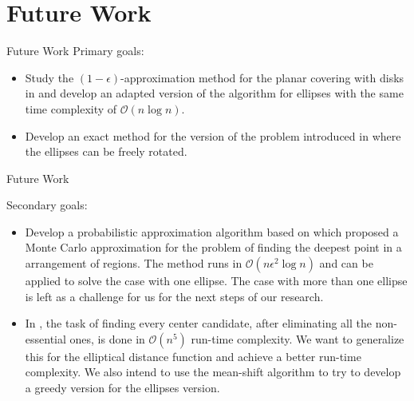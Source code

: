 \documentclass{beamer}
\newcommand{\bigO}{\mathscr{O}}
\begin{document}
\section{Future Work}

\begin{frame}{Future Work}
	Primary goals:
\begin{itemize}
	\item Study the $(1-\epsilon)$-approximation method for the planar covering with disks in \autocite{cabello:2006} and develop an adapted version of the algorithm for ellipses with the same time complexity of $\bigO(n\log{n})$.
	
	\item Develop an exact method for the version of the problem introduced in \autocite{andreta} where the ellipses can be freely rotated.
\end{itemize}
\end{frame}

\begin{frame}{Future Work}
	
	Secondary goals:
	\begin{itemize}
		 

	\item Develop a probabilistic approximation algorithm based on \autocite{aronov:2008} which proposed a Monte Carlo approximation for the problem of finding the deepest point in a arrangement of regions. The method runs in $\bigO(n\epsilon^2\log{n})$ and can be applied to solve the case with one ellipse. The case with more than one ellipse is left as a challenge for us for the next steps of our research.
	
	\item In \autocite{zhou}, the task of finding every center candidate, after eliminating all the non-essential ones, is done in $\bigO(n^5)$ run-time complexity. We want to generalize this for the elliptical distance function and achieve a better run-time complexity. We also intend to use the mean-shift algorithm to try to develop a greedy version for the ellipses version.
	
		\end{itemize}
\end{frame}

\begin{frame}[allowframebreaks]
%
%	
\printbibliography
\end{frame}
\end{document}
